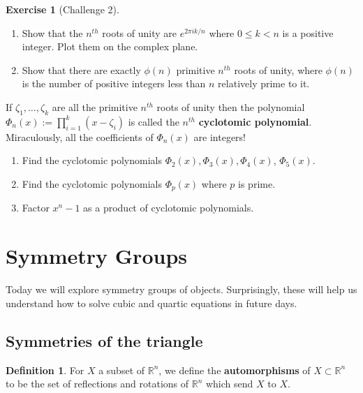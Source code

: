 \documentclass[reqno, 12pt, letter]{article}
\theoremstyle{plain}
\theoremstyle{definition}
\newtheorem{definition}[theorem]{Definition}
\newtheorem{exercise}[theorem]{Exercise}
\theoremstyle{remark}
\numberwithin{equation}{section}
\newcommand\br{{\mathbb R}}
\begin{document}
	\begin{exercise}[Challenge 2] $ $
		\begin{enumerate}
			\item Show that the $ n^{th}$ roots of unity are $ e^{2 \pi i k / n}$ where $ 0 \le k < n$ is a positive integer. Plot them on the complex plane. 
			\item Show that there are exactly $ \phi(n)$ primitive $ n^{th}$ roots of unity, where $ \phi(n)$ is the number of positive integers less than $ n$ relatively prime to it.
		\end{enumerate}
		If $ \zeta_1, \dots, \zeta_k$ are all the primitive $ n^{th}$ roots of unity then the polynomial $ \Phi_n(x) := \prod _{i=1}^k (x - \zeta_i)$ is called the $ n^{th}$ \textbf{cyclotomic polynomial}. Miraculously, all the coefficients of $ \Phi_n(x)$ are integers!
		\begin{enumerate}[resume]
			\item Find the cyclotomic polynomials $ \Phi_2(x), \Phi_3(x), \Phi_4(x)$, $ \Phi_5(x)$.
			\item Find the cyclotomic polynomials $ \Phi_p(x)$ where $ p$ is prime.
			\item Factor $ x^n - 1$ as a product of cyclotomic polynomials.
		\end{enumerate}
	\end{exercise}
	

\newpage
\section{Symmetry Groups}

Today we will explore symmetry groups of objects. Surprisingly, these will help us understand
how to solve cubic and quartic equations in future days.

\subsection{Symmetries of the triangle}

\begin{definition}
	\label{definition:automorphisms}
	For $X$ a subset of $\br^n$, we define the {\bf automorphisms} of $X \subset \br^n$ to be the set of
	reflections and rotations of $\br^n$ which send $X$ to $X$.
\end{definition}
\end{document}
